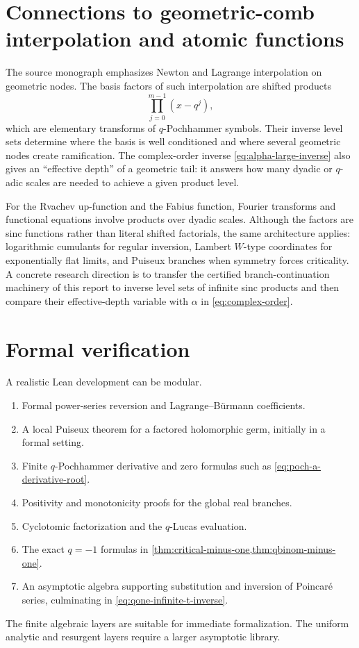 \documentclass[11pt,oneside]{book}
\theoremstyle{definition}
\theoremstyle{remark}
\begin{document}
\section{Connections to geometric-comb interpolation and atomic functions}
The source monograph emphasizes Newton and Lagrange interpolation on geometric
nodes.  The basis factors of such interpolation are shifted products
\[
 \prod_{j=0}^{m-1}(x-q^j),
\]
which are elementary transforms of $q$-Pochhammer symbols.  Their inverse
level sets determine where the basis is well conditioned and where several
geometric nodes create ramification.  The complex-order inverse
\eqref{eq:alpha-large-inverse} also gives an ``effective depth'' of a geometric
tail: it answers how many dyadic or $q$-adic scales are needed to achieve a
given product level.

For the Rvachev up-function and the Fabius function, Fourier transforms and
functional equations involve products over dyadic scales.  Although the
factors are sinc functions rather than literal shifted factorials, the same
architecture applies: logarithmic cumulants for regular inversion, Lambert
$W$-type coordinates for exponentially flat limits, and Puiseux branches when
symmetry forces criticality.  A concrete research direction is to transfer the
certified branch-continuation machinery of this report to inverse level sets of
infinite sinc products and then compare their effective-depth variable with
$\alpha$ in \eqref{eq:complex-order}.

\section{Formal verification}
A realistic Lean development can be modular.
\begin{enumerate}
\item Formal power-series reversion and Lagrange--B\"urmann coefficients.
\item A local Puiseux theorem for a factored holomorphic germ, initially in a
      formal setting.
\item Finite $q$-Pochhammer derivative and zero formulas such as
      \eqref{eq:poch-a-derivative-root}.
\item Positivity and monotonicity proofs for the global real branches.
\item Cyclotomic factorization and the $q$-Lucas evaluation.
\item The exact $q=-1$ formulas in \cref{thm:critical-minus-one,thm:qbinom-minus-one}.
\item An asymptotic algebra supporting substitution and inversion of
      Poincar\'e series, culminating in \eqref{eq:qone-infinite-t-inverse}.
\end{enumerate}
The finite algebraic layers are suitable for immediate formalization.  The
uniform analytic and resurgent layers require a larger asymptotic library.
\end{document}
